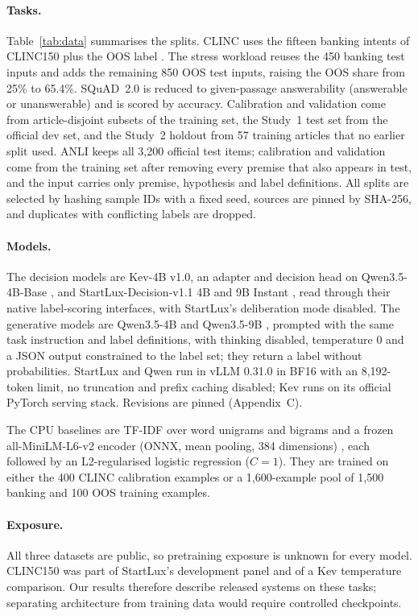 \documentclass[11pt]{article}
\begin{document}
\paragraph{Tasks.}
Table~\ref{tab:data} summarises the splits. CLINC uses the fifteen banking intents of CLINC150 plus the OOS label \citep{larson-etal-2019-evaluation}. The stress workload reuses the 450 banking test inputs and adds the remaining 850 OOS test inputs, raising the OOS share from 25\% to 65.4\%. SQuAD~2.0 is reduced to given-passage answerability (answerable or unanswerable) and is scored by accuracy. Calibration and validation come from article-disjoint subsets of the training set, the Study~1 test set from the official dev set, and the Study~2 holdout from 57 training articles that no earlier split used. ANLI keeps all 3,200 official test items; calibration and validation come from the training set after removing every premise that also appears in test, and the input carries only premise, hypothesis and label definitions. All splits are selected by hashing sample IDs with a fixed seed, sources are pinned by SHA-256, and duplicates with conflicting labels are dropped.

\paragraph{Models.}
The decision models are Kev-4B v1.0, an adapter and decision head on Qwen3.5-4B-Base \citep{kev4b}, and StartLux-Decision-v1.1 4B and 9B Instant \citep{zhuang2026startlux}, read through their native label-scoring interfaces, with StartLux's deliberation mode disabled. The generative models are Qwen3.5-4B and Qwen3.5-9B \citep{qwen35}, prompted with the same task instruction and label definitions, with thinking disabled, temperature 0 and a JSON output constrained to the label set; they return a label without probabilities. StartLux and Qwen run in vLLM 0.31.0 in BF16 with an 8,192-token limit, no truncation and prefix caching disabled; Kev runs on its official PyTorch serving stack. Revisions are pinned (Appendix~C).

The CPU baselines are TF-IDF over word unigrams and bigrams and a frozen all-MiniLM-L6-v2 encoder (ONNX, mean pooling, 384 dimensions) \citep{wang2020minilm,reimers-gurevych-2019-sentence}, each followed by an L2-regularised logistic regression ($C{=}1$). They are trained on either the 400 CLINC calibration examples or a 1,600-example pool of 1,500 banking and 100 OOS training examples.

\paragraph{Exposure.}
All three datasets are public, so pretraining exposure is unknown for every model. CLINC150 was part of StartLux's development panel and of a Kev temperature comparison. Our results therefore describe released systems on these tasks; separating architecture from training data would require controlled checkpoints.
\end{document}
